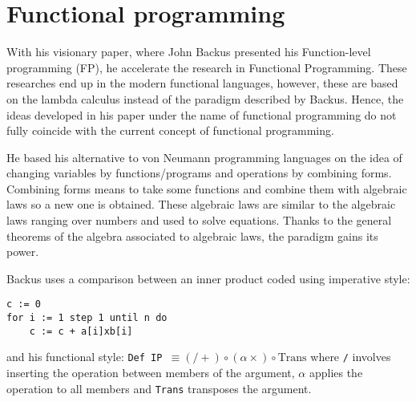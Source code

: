  
 
    \section{Functional programming} \label{sec:fpro}

With his visionary paper, where John Backus presented his Function-level programming (FP), he accelerate the research in Functional Programming.
These researches end up in the modern functional languages, however, these are based on the lambda calculus instead of the paradigm described by Backus. 
Hence, the ideas developed in his paper under the name of functional programming do not fully coincide with the current concept of functional programming. 

He based his alternative to von Neumann programming languages on the idea of changing variables by functions/programs and operations by combining forms. 
Combining forms means to take some functions and combine them with algebraic laws so a new one is obtained.
These algebraic laws are similar to the algebraic laws ranging over numbers and used to solve equations.
Thanks to the general theorems of the algebra associated to algebraic laws, the paradigm gains its power. 

Backus uses a comparison between an inner product coded using imperative style: 
\vspace{-0.5cm}
\begin{verbatim}
c := 0
for i := 1 step 1 until n do
    c := c + a[i]xb[i]
\end{verbatim}
and his functional style:
\newline\newline
\texttt{Def IP $\equiv (/+)\circ(\alpha \times)\circ \textrm{Trans}$} 
\newline\newline
where \texttt{/} involves inserting the operation between members of the argument, 
\texttt{$\alpha$} applies the operation to all members and
\texttt{Trans} transposes the argument.

